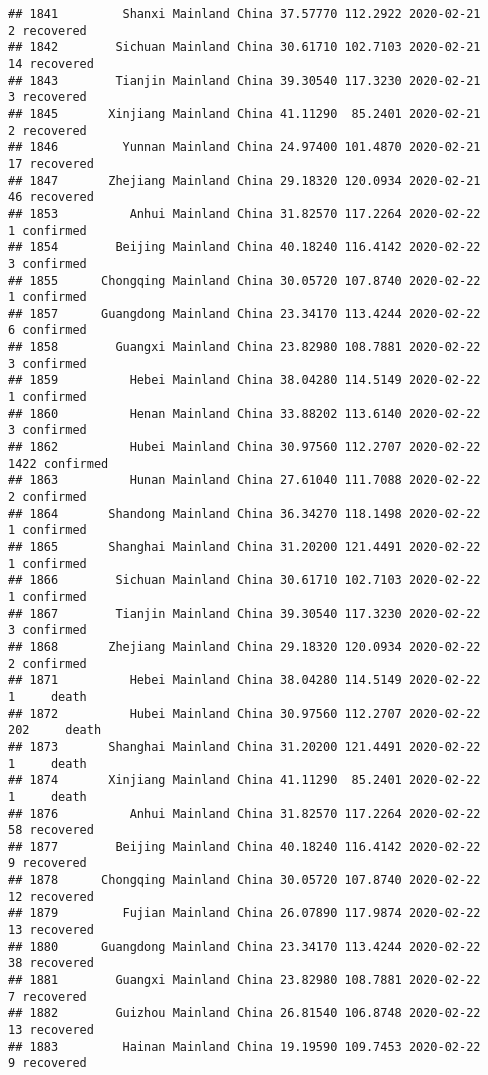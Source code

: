 \documentclass[
]{article}
\begin{document}
\begin{verbatim}
## 1841         Shanxi Mainland China 37.57770 112.2922 2020-02-21     2 recovered
## 1842        Sichuan Mainland China 30.61710 102.7103 2020-02-21    14 recovered
## 1843        Tianjin Mainland China 39.30540 117.3230 2020-02-21     3 recovered
## 1845       Xinjiang Mainland China 41.11290  85.2401 2020-02-21     2 recovered
## 1846         Yunnan Mainland China 24.97400 101.4870 2020-02-21    17 recovered
## 1847       Zhejiang Mainland China 29.18320 120.0934 2020-02-21    46 recovered
## 1853          Anhui Mainland China 31.82570 117.2264 2020-02-22     1 confirmed
## 1854        Beijing Mainland China 40.18240 116.4142 2020-02-22     3 confirmed
## 1855      Chongqing Mainland China 30.05720 107.8740 2020-02-22     1 confirmed
## 1857      Guangdong Mainland China 23.34170 113.4244 2020-02-22     6 confirmed
## 1858        Guangxi Mainland China 23.82980 108.7881 2020-02-22     3 confirmed
## 1859          Hebei Mainland China 38.04280 114.5149 2020-02-22     1 confirmed
## 1860          Henan Mainland China 33.88202 113.6140 2020-02-22     3 confirmed
## 1862          Hubei Mainland China 30.97560 112.2707 2020-02-22  1422 confirmed
## 1863          Hunan Mainland China 27.61040 111.7088 2020-02-22     2 confirmed
## 1864       Shandong Mainland China 36.34270 118.1498 2020-02-22     1 confirmed
## 1865       Shanghai Mainland China 31.20200 121.4491 2020-02-22     1 confirmed
## 1866        Sichuan Mainland China 30.61710 102.7103 2020-02-22     1 confirmed
## 1867        Tianjin Mainland China 39.30540 117.3230 2020-02-22     3 confirmed
## 1868       Zhejiang Mainland China 29.18320 120.0934 2020-02-22     2 confirmed
## 1871          Hebei Mainland China 38.04280 114.5149 2020-02-22     1     death
## 1872          Hubei Mainland China 30.97560 112.2707 2020-02-22   202     death
## 1873       Shanghai Mainland China 31.20200 121.4491 2020-02-22     1     death
## 1874       Xinjiang Mainland China 41.11290  85.2401 2020-02-22     1     death
## 1876          Anhui Mainland China 31.82570 117.2264 2020-02-22    58 recovered
## 1877        Beijing Mainland China 40.18240 116.4142 2020-02-22     9 recovered
## 1878      Chongqing Mainland China 30.05720 107.8740 2020-02-22    12 recovered
## 1879         Fujian Mainland China 26.07890 117.9874 2020-02-22    13 recovered
## 1880      Guangdong Mainland China 23.34170 113.4244 2020-02-22    38 recovered
## 1881        Guangxi Mainland China 23.82980 108.7881 2020-02-22     7 recovered
## 1882        Guizhou Mainland China 26.81540 106.8748 2020-02-22    13 recovered
## 1883         Hainan Mainland China 19.19590 109.7453 2020-02-22     9 recovered

\end{verbatim}
\end{document}
